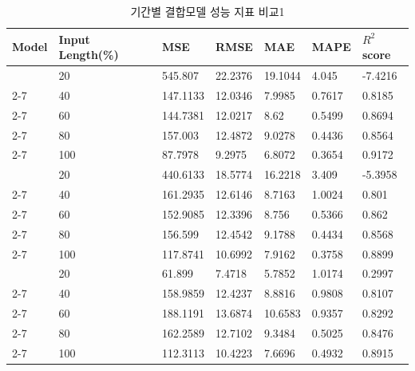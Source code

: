 \documentclass[11pt]{report}
\begin{document}
\begin{table}[H]
	\begin{center}
	\vspace{0.5cm}
	\begin{tabular}{|l|l|l|l|l|l|l|}
		\hline
		\rowcolor[HTML]{C0C0C0} 
		Model                               & Input Length(\%) & MSE      & RMSE    & MAE     & MAPE   & $R^2$score \\ \hline
											& 20               & 545.807  & 22.2376 & 19.1044 & 4.045  & -7.4216                       \\ \cline{2-7} 
											& 40               & 147.1133 & 12.0346 & 7.9985  & 0.7617 & 0.8185                        \\ \cline{2-7} 
											& 60               & 144.7381 & 12.0217 & 8.62    & 0.5499 & 0.8694                        \\ \cline{2-7} 
											& 80               & 157.003  & 12.4872 & 9.0278  & 0.4436 & 0.8564                        \\ \cline{2-7} 
		\multirow{-5}{*}{S-ANN}      & 100              & 87.7978  & 9.2975  & 6.8072  & 0.3654 & 0.9172                        \\ \hline
											& 20               & 440.6133 & 18.5774 & 16.2218 & 3.409  & -5.3958                       \\ \cline{2-7} 
											& 40               & 161.2935 & 12.6146 & 8.7163  & 1.0024 & 0.801                         \\ \cline{2-7} 
											& 60               & 152.9085 & 12.3396 & 8.756   & 0.5366 & 0.862                         \\ \cline{2-7} 
											& 80               & 156.599  & 12.4542 & 9.1788  & 0.4434 & 0.8568                        \\ \cline{2-7} 
		\multirow{-5}{*}{S-STD}     & 100              & 117.8741 & 10.6992 & 7.9162  & 0.3758 & 0.8899                        \\ \hline
											& 20               & 61.899   & 7.4718  & 5.7852  & 1.0174 & 0.2997                        \\ \cline{2-7} 
											& 40               & 158.9859 & 12.4237 & 8.8816  & 0.9808 & 0.8107                        \\ \cline{2-7} 
											& 60               & 188.1191 & 13.6874 & 10.6583 & 0.9357 & 0.8292                        \\ \cline{2-7} 
											& 80               & 162.2589 & 12.7102 & 9.3484  & 0.5025 & 0.8476                        \\ \cline{2-7} 
		\multirow{-5}{*}{S-Mov Avg} & 100              & 112.3113 & 10.4223 & 7.6696  & 0.4932 & 0.8915                        \\ \hline
		\end{tabular}
	\end{center}
	\caption{기간별 결합모델 성능 지표 비교1}
	\label{tab:com_gi_eval_1}
\end{table}
\end{document}
